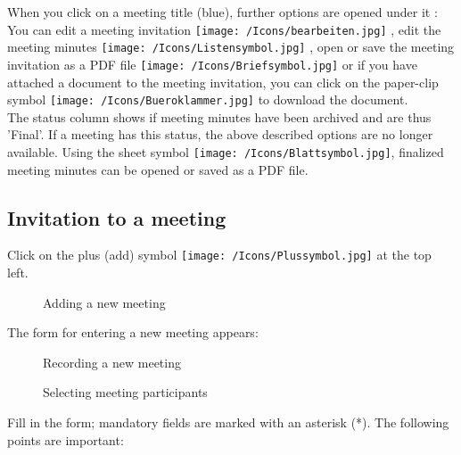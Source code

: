 When you click on a meeting title (blue), further options are opened under it : You can edit a meeting invitation \texttt{[image: /Icons/bearbeiten.jpg]} , edit the meeting minutes \texttt{[image: /Icons/Listensymbol.jpg]} , open or save the meeting invitation as a PDF file \texttt{[image: /Icons/Briefsymbol.jpg]}  or if you have attached a document to the meeting invitation, you can click on the paper-clip symbol \texttt{[image: /Icons/Bueroklammer.jpg]}  to download the document. \\
The status column  shows if meeting minutes have been archived and are thus 'Final'. If a meeting has this status, the above described options are no longer available. Using the sheet symbol \texttt{[image: /Icons/Blattsymbol.jpg]}, finalized meeting minutes can be opened or saved as a PDF file.

\subsection{Invitation to a meeting}
\label{bkm:Ref434828480}

Click on the plus (add) symbol \texttt{[image: /Icons/Plussymbol.jpg]}  at the top left.

\vspace{\baselineskip}

\begin{figure}[H]
\caption{Adding a new meeting}
\end{figure}


The form for entering a new meeting appears:

\begin{figure}[H]
\caption{Recording a new meeting}
\end{figure}

\begin{figure}[H]
\caption{Selecting meeting participants}
\end{figure}

Fill in the form; mandatory fields are marked with an asterisk (*). The following points are important:

